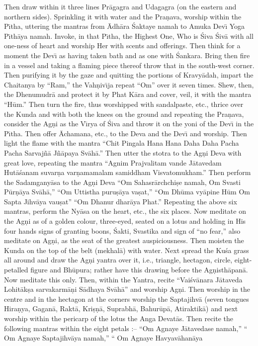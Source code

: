 Then draw within it three lines Pr\=agagra and Udagagra (on the eastern and northern sides). Sprinkling it with water and the Pra\d{n}ava, worship within the P\={\i}tha, uttering the mantras from \=Adh\=ara \'Saktaye namah to Amuka Dev\={\i} Yoga P\={\i}th\=aya namah. Invoke, in that P\={\i}tha, the Highest One, Who is \'Siva \'Siv\=a with all one-ness of heart and worship Her with scents and offerings. Then think for a moment the Dev\={\i} as having taken bath and as one with \'Sankara. Bring then fire in a vessel and taking a flaming piece thereof throw that in the south-west corner. Then purifying it by the gaze and quitting the portions of Kravy\=adah, impart the Chaitanya by ``Ram,'' the Vah\d{n}iv\={\i}ja repeat ``Om'' over it seven times. Shew, then, the Dhenumudr\=a and protect it by Phat K\=ara and cover, veil, it with the mantra ``H\=um.'' Then turn the fire, thus worshipped with sandalpaste, etc., thrice over the Kunda and with both the knees on the ground and repeating the Pra\d{n}ava, consider the Ag\d{n}i as the V\={\i}rya of \'Siva and throw it on the yoni of the Dev\={\i} in the P\={\i}tha. Then offer \=Achamana, etc., to the Deva and the Dev\={\i} and worship. Then light the flame with the mantra ``Chit Pingala Hana Hana Daha Daha Pacha Pacha Sarvaj\~n\=a J\~n\=apaya Sv\=ah\=a.'' Then utter the stotra to the Ag\d{n}i Deva with great love, repeating the mantra ``Agnim Prajvalitam vande J\=atavedam Hut\=a\'sanam suvar\d{n}a var\d{n}amamalam samiddham Visvatomukham.'' Then perform the Sadamgany\=asa to the Ag\d{n}i Deva ``Om Sahasr\=archchi\d{s}e namah, Om Svasti P\=ur\d{n}\=aya Sv\=ah\=a,'' ``Om Uttistha puru\d{s}\=aya va\d{s}at,'' ``Om Dh\=uma vy\=apine H\=um Om Sapta Jihv\=aya vau\d{s}at'' ``Om Dhanur dhar\=aya Phat.'' Repeating the above six mantras, perform the Ny\=asa on the heart, etc., the six places. Now meditate on the Ag\d{n}i as of a golden colour, three-eyed, seated on a lotus and holding in His four hands signs of granting boons, \'Sakti, Svastika and sign of ``no fear,'' also meditate on Ag\d{n}i, as the seat of the greatest auspiciousness. Then moisten the Kunda on the top of the belt (mekhal\=a) with water. Next spread the Ku\'sa grass all around and draw the Ag\d{n}i yantra over it, i.e., triangle, hectagon, circle, eight-petalled figure and Bh\=upura; rather have this drawing before the Ag\d{n}isth\=apan\=a. Now meditate this only. Then, within the Yantra, recite ``Vai\'sv\=anara J\=ataveda Lohit\=ak\d{s}a sarvakarm\=a\d{n}i S\=adhaya Sv\=ah\=a'' and worship Ag\d{n}i. Then worship in the centre and in the hectagon at the corners worship the Saptajihv\=a (seven tongues Hira\d{n}ya, Gagan\=a, Rakt\=a, Kri\d{s}\d{n}\=a, Suprabh\=a, Bahur\=up\=a, Atiraktik\=a) and next worship within the pericarp of the lotus the Anga Devat\=as. Then recite the following mantras within the eight petals :-- ``Om Agnaye J\=atavedase namah,'' `` Om Agnaye Saptajihv\=aya namah,'' `` Om Agnaye Havyav\=ahan\=aya

